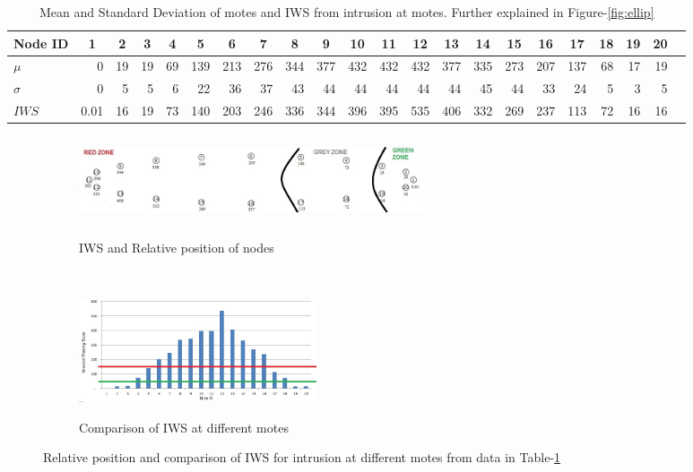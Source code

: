 \documentclass[conference,final]{IEEEtran}
\newcommand{\red}[1]{\pdfmarkupcomment[markup=Highlight,color=red]{#1}}
\newcommand{\green}[1]{\pdfmarkupcomment[markup=Highlight,color=green]{#1}}
\newcommand{\grey}[1]{\pdfmarkupcomment[markup=Highlight,color=gray]{#1}}
\newcommand*{\bd}[1]{\multicolumn{1}{|c}{\bfseries #1}}
\begin{document}
\begin{table}[t!]
\centering
\begin{tabular}{|l|*{20}{r|}r}
\hline
\bd{Node ID}           & \bd{1} & \bd{2} & \bd{3} & \bd{4} & \bd{5} & \bd{6} & \bd{7} & \bd{8} & \bd{9} & \bd{10} & \bd{11} & \bd{12} & \bd{13} & \bd{14} & \bd{15} & \bd{16} & \bd{17} & \bd{18} & \bd{19} & \bd{20} \\
\hline

$\mu$            & 0 &19 & 19& 69&139 &213&276&344&377&432 &432 &432 &377 &335 &273 & 207&137 & 68 & 17 & 19 \\
$\sigma$		 & 0 & 5 & 5 & 6 & 22 & 36& 37&43 &44 & 44 & 44 & 44 & 44 & 45 & 44  & 33 & 24 & 5 & 3 & 5 \\
$\mathit{IWS}$
                 &0.01&16 &19 &73 & 140 &203 &246 &336 &344 &396 &395 &535 &406 &332 &269 &237 &113 & 72& 16 & 16 \\

\hline
\end{tabular}
\caption{Mean and Standard Deviation of motes and IWS from intrusion at motes. Further explained in Figure-\ref{fig:ellip}}
\label{tab:ellip}
\end{table}


\begin{figure}[t!]
\label{fig:ellip}
    \centering
    \begin{subfigure}[b]{0.5\textwidth}
        \centering
        \includegraphics[height=1in, width=4in]{Elliptical}
        \label{subfig:elliptopo}
        \caption{IWS and Relative position of nodes}
    \end{subfigure}%
    ~ 
    \begin{subfigure}[b]{0.5\textwidth}
        \centering
        \includegraphics[height=1.2in]{Elliptical_column}
        \label{subfig:ellipgraph}
        \caption{Comparison of IWS at different motes}
    \end{subfigure}
    \caption{Relative position and comparison of IWS for intrusion at different motes from data in Table-\ref{tab:ellip}}
\end{figure}
\end{document}
